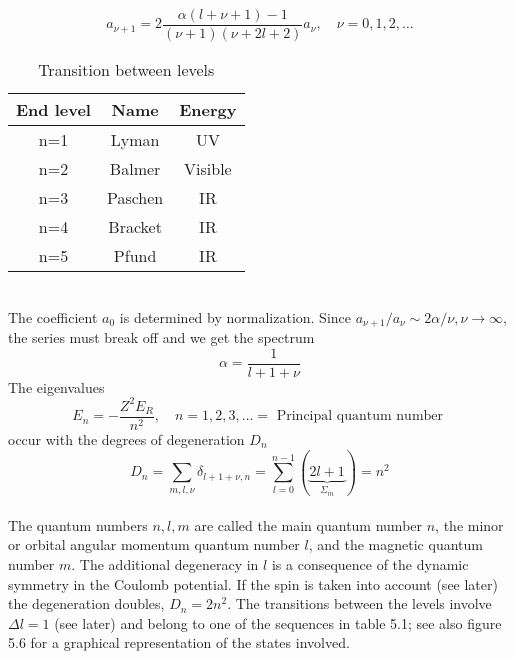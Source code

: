 \begin{equation}
    a_{\nu+1}=2 \frac{\alpha(l+\nu+1)-1}{(\nu+1)(\nu+2 l+2)} a_{\nu}, \quad \nu=0,1,2, \ldots
    \end{equation}
\begin{table}
    \centering
    \Large
    \begin{tabular}{c|c|c}

        \hline
        End level & Name & Energy\\
        \hline
        n=1 & Lyman & UV \\
        n=2 & Balmer & Visible\\
        n=3 & Paschen & IR \\
        n=4 & Bracket & IR\\
        n=5 & Pfund & IR \\
        \hline
    \end{tabular}
    \caption{Transition between levels}
\end{table}
\\
The coefficient $a_0$ is determined by normalization. Since $a_{\nu + 1} / a_{\nu} \sim 2\alpha / \nu, \nu \rightarrow \infty$, the series must break off and we get the spectrum
\begin{equation}
    \alpha = \frac{1}{l+1+\nu}
\end{equation}
The eigenvalues
\begin{equation}
    E_{n}=-\frac{Z^{2} E_{R}}{n^{2}}, \quad n=1,2,3, \ldots=\text { Principal quantum number }
    \end{equation}
occur with the degrees of degeneration $D_n$
\begin{equation}
    D_{n}=\sum_{m, l, \nu} \delta_{l+1+\nu, n}=\sum_{l=0}^{n-1}(\underbrace{2 l+1}_{\Sigma_{m}})=n^{2}
    \end{equation}
\\
The quantum numbers $n, l, m$ are called the main quantum number $n$, the minor or orbital angular momentum quantum number $l$, and the magnetic quantum number $m$. The additional degeneracy in $l$ is a consequence of the dynamic symmetry in the Coulomb potential. If the spin is taken into account (see later) the degeneration doubles, $D_n = 2n^2$. The transitions between the levels involve $\Delta l = 1$ (see later) and belong to one of the sequences in table 5.1; see also figure 5.6 for a graphical representation of the states involved.

